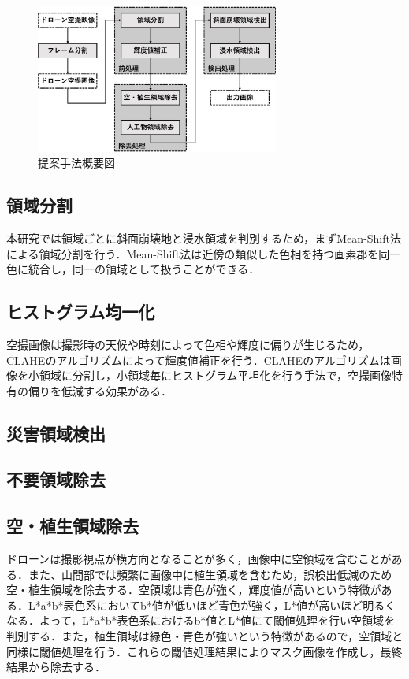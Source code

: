 \documentclass[a4paper, twocolumn, xelatex, 10pt, ja=standard, Ligatures=TeX]{bxjsarticle}
\begin{document}
		\begin{figure}[t] %
			\centering
			\includegraphics[width=8cm]{img/howto3.jpg}
			\caption{提案手法概要図}
			\label{img01}
		\end{figure}

		\subsection{領域分割}
            本研究では領域ごとに斜面崩壊地と浸水領域を判別するため，まずMean-Shift法による領域分割を行う．Mean-Shift法は近傍の類似した色相を持つ画素郡を同一色に統合し，同一の領域として扱うことができる．

        \subsection{ヒストグラム均一化}
            空撮画像は撮影時の天候や時刻によって色相や輝度に偏りが生じるため，CLAHEのアルゴリズム\cite{art05}によって輝度値補正を行う．CLAHEのアルゴリズムは画像を小領域に分割し，小領域毎にヒストグラム平坦化を行う手法で，空撮画像特有の偏りを低減する効果がある．
		
		\subsection{災害領域検出}
		\subsection{不要領域除去}


			

		\subsection{空・植生領域除去}
			ドローンは撮影視点が横方向となることが多く，画像中に空領域を含むことがある．また、山間部では頻繁に画像中に植生領域を含むため，誤検出低減のため空・植生領域を除去する．空領域は青色が強く，輝度値が高いという特徴がある．L*a*b*表色系においてb*値が低いほど青色が強く，L*値が高いほど明るくなる．よって，L*a*b*表色系におけるb*値とL*値にて閾値処理を行い空領域を判別する．また，植生領域は緑色・青色が強いという特徴があるので，空領域と同様に閾値処理を行う．これらの閾値処理結果によりマスク画像を作成し，最終結果から除去する．
\end{document}
